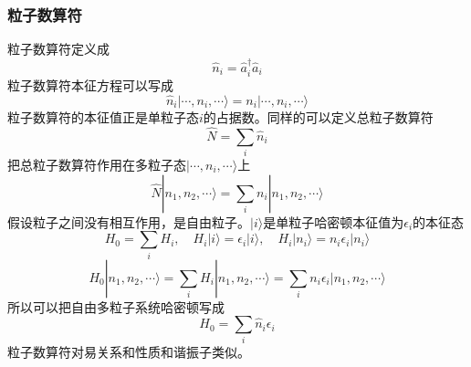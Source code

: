 \documentclass[12pt]{article}
\begin{document}
\subsubsection{粒子数算符}
粒子数算符定义成
\begin{equation*}
    \hat{n}_i=\hat{a}_i^\dagger\hat{a}_i
\end{equation*}
粒子数算符本征方程可以写成
\begin{equation*}
    \hat{n}_i|\cdots,n_i,\cdots\rangle=n_i|\cdots,n_i,\cdots\rangle
\end{equation*}
粒子数算符的本征值正是单粒子态$i$的占据数。同样的可以定义总粒子数算符
\begin{equation*}
    \hat{N}=\sum_{i}\hat{n}_i
\end{equation*}
把总粒子数算符作用在多粒子态$|\cdots,n_i,\cdots\rangle$上
\begin{equation*}
    \hat{N}|n_1,n_2,\cdots\rangle=\sum_{i}n_i|n_1,n_2,\cdots\rangle
\end{equation*}
假设粒子之间没有相互作用，是自由粒子。$|i\rangle$是单粒子哈密顿本征值为$\epsilon_i$的本征态
\begin{equation*}
    H_0=\sum_{i}H_{i},\quad H_i|i\rangle=\epsilon_i|i\rangle,\quad H_i|n_i\rangle=n_i\epsilon_i|n_i\rangle
\end{equation*}
\begin{equation*}
    H_{0}|n_1,n_2,\cdots\rangle=\sum_{i}H_i|n_1,n_2,\cdots\rangle=\sum_{i}n_i\epsilon_i|n_1,n_2,\cdots\rangle
\end{equation*}
所以可以把自由多粒子系统哈密顿写成
\begin{equation*}
    H_0=\sum_{i}\hat{n}_i\epsilon_i
\end{equation*}
粒子数算符对易关系和性质和谐振子类似。
\end{document}
